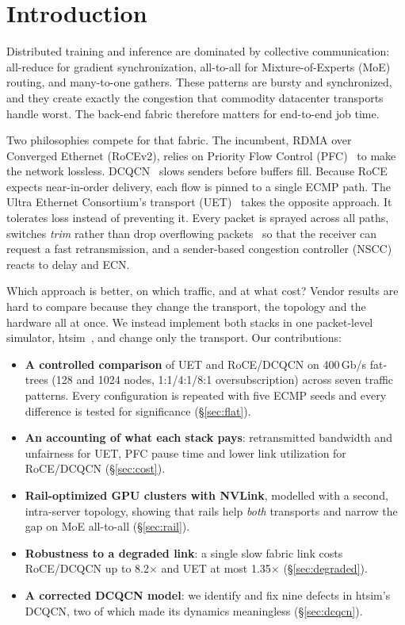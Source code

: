 \documentclass[conference]{IEEEtran}
\begin{document}
\section{Introduction}

Distributed training and inference are dominated by collective communication:
all-reduce for gradient synchronization, all-to-all for Mixture-of-Experts (MoE)
routing, and many-to-one gathers. These patterns are bursty and synchronized,
and they create exactly the congestion that commodity datacenter transports
handle worst. The back-end fabric therefore matters for end-to-end job time.

Two philosophies compete for that fabric. The incumbent, RDMA over Converged
Ethernet (RoCEv2), relies on Priority Flow Control (PFC)~\cite{pfc} to make the
network lossless. DCQCN~\cite{dcqcn} slows senders before buffers fill. Because
RoCE expects near-in-order delivery, each flow is pinned to a single ECMP path.
The Ultra Ethernet Consortium's transport (UET)~\cite{uec-spec,uec-design}
takes the opposite approach. It tolerates loss instead of preventing it. Every
packet is sprayed across all paths, switches \emph{trim} rather than drop
overflowing packets~\cite{ndp} so that the receiver can request a fast
retransmission, and a sender-based congestion controller (NSCC) reacts to delay
and ECN.

Which approach is better, on which traffic, and at what cost? Vendor results
are hard to compare because they change the transport, the topology and the
hardware all at once. We instead implement both stacks in one packet-level
simulator, htsim~\cite{ndp}, and change only the transport. Our contributions:

\begin{itemize}
  \item \textbf{A controlled comparison} of UET and RoCE/DCQCN on 400\,Gb/s
        fat-trees (128 and 1024 nodes, 1:1/4:1/8:1 oversubscription) across
        seven traffic patterns. Every configuration is repeated with five ECMP
        seeds and every difference is tested for significance (\S\ref{sec:flat}).
  \item \textbf{An accounting of what each stack pays}: retransmitted bandwidth
        and unfairness for UET, PFC pause time and lower link utilization for
        RoCE/DCQCN (\S\ref{sec:cost}).
  \item \textbf{Rail-optimized GPU clusters with NVLink}, modelled with a
        second, intra-server topology, showing that rails help \emph{both}
        transports and narrow the gap on MoE all-to-all (\S\ref{sec:rail}).
  \item \textbf{Robustness to a degraded link}: a single slow fabric link costs
        RoCE/DCQCN up to 8.2$\times$ and UET at most 1.35$\times$
        (\S\ref{sec:degraded}).
  \item \textbf{A corrected DCQCN model}: we identify and fix nine defects in
        htsim's DCQCN, two of which made its dynamics meaningless
        (\S\ref{sec:dcqcn}).
\end{itemize}
\end{document}
